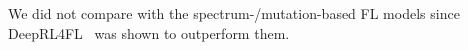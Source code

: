 We did not compare with the spectrum-/mutation-based FL
models since DeepRL4FL~\cite{icse21-fl} was shown to outperform
them.

